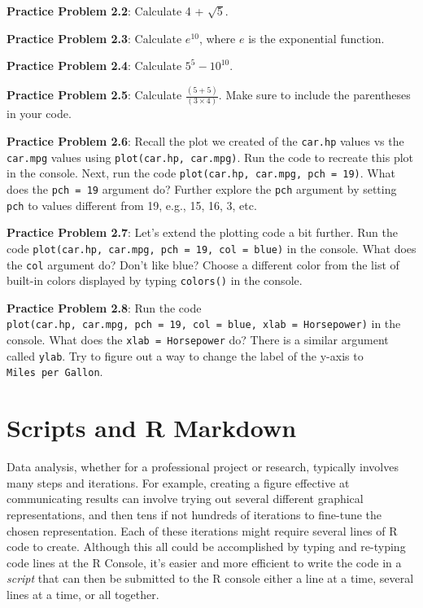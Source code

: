 \documentclass[
]{krantz}
\begin{document}
\textbf{Practice Problem 2.2}: Calculate 4 + \(\sqrt{5}\).

\textbf{Practice Problem 2.3}: Calculate \(e^{10}\), where \(e\) is the exponential function.

\textbf{Practice Problem 2.4}: Calculate \(5^5 - 10^{10}\).

\textbf{Practice Problem 2.5}: Calculate \(\frac{(5 + 5)}{(3 \times 4)}\). Make sure to include the parentheses in your code.

\textbf{Practice Problem 2.6}: Recall the plot we created of the \texttt{car.hp} values vs the \texttt{car.mpg} values using \texttt{plot(car.hp,\ car.mpg)}. Run the code to recreate this plot in the console. Next, run the code \texttt{plot(car.hp,\ car.mpg,\ pch\ =\ 19)}. What does the \texttt{pch\ =\ 19} argument do? Further explore the \texttt{pch} argument by setting \texttt{pch} to values different from 19, e.g., 15, 16, 3, etc.

\textbf{Practice Problem 2.7}: Let's extend the plotting code a bit further. Run the code \texttt{plot(car.hp,\ car.mpg,\ pch\ =\ 19,\ col\ =\ \textquotesingle{}blue\textquotesingle{})} in the console. What does the \texttt{col} argument do? Don't like blue? Choose a different color from the list of built-in colors displayed by typing \texttt{colors()} in the console.

\textbf{Practice Problem 2.8}: Run the code \texttt{plot(car.hp,\ car.mpg,\ pch\ =\ 19,\ col\ =\ \textquotesingle{}blue\textquotesingle{},\ xlab\ =\ \textquotesingle{}Horsepower\textquotesingle{})} in the console. What does the \texttt{xlab\ =\ \textquotesingle{}Horsepower\textquotesingle{}} do? There is a similar argument called \texttt{ylab}. Try to figure out a way to change the label of the y-axis to \texttt{Miles\ per\ Gallon}.

\hypertarget{scripts}{%
\chapter{Scripts and R Markdown}\label{scripts}}

Data analysis, whether for a professional project or research, typically involves many steps and iterations. For example, creating a figure effective at communicating results can involve trying out several different graphical representations, and then tens if not hundreds of iterations to fine-tune the chosen representation. Each of these iterations might require several lines of R code to create. Although this all could be accomplished by typing and re-typing code lines at the R Console, it's easier and more efficient to write the code in a \emph{script} that can then be submitted to the R console either a line at a time, several lines at a time, or all together.
\end{document}
